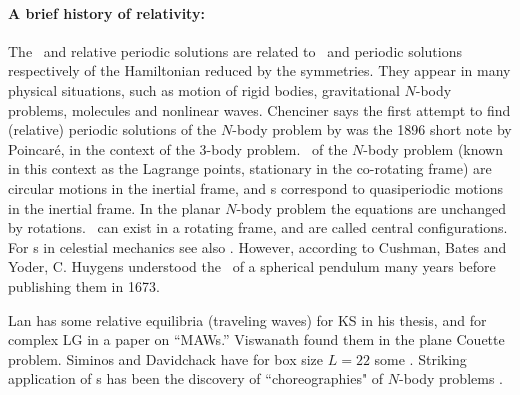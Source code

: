 \paragraph{A brief history of relativity:}\label{cont:rpoCond}
The \reqva\ and relative periodic solutions
are related to
\eqva\ and periodic solutions respectively
of the Hamiltonian reduced by the symmetries.
They appear in many physical situations,
such as motion of rigid bodies, gravitational
$N$-body problems, molecules and nonlinear waves.
Chenciner says
the first attempt to find (relative) periodic solutions of the
$N$-body problem by
was the 1896 short note by Poincar\'e,
in the context of the 3-body problem.
\Reqva\ of the $N$-body problem
(known in this context as the Lagrange points, stationary in
the co-rotating frame) are circular motions in the inertial frame,
and {\rpo s} correspond to quasiperiodic motions in the inertial frame.
In the planar $N$-body problem the equations are unchanged by
rotations. \Reqva\ can exist in a rotating frame,
and are called central configurations.
For \rpo s in celestial mechanics see also .
However, according to
Cushman, Bates and Yoder,
C. Huygens understood the \reqva\ of a
spherical pendulum many
years before publishing them in 1673.

Lan has some relative equilibria (traveling waves) for KS in his
thesis, %
 and for complex LG in a paper on ``MAWs.''
Viswanath %
found them in the plane Couette problem.
Siminos and Davidchack have for box size $L=22$ some \eqva.
Striking application of \rpo s has been the discovery
of ``choreographies" of $N$-body problems%
.
